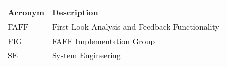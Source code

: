 \addtocounter{table}{-1}
\begin{longtable}{p{}p{}}\hline
\textbf{Acronym} & \textbf{Description}  \\\hline

FAFF & First-Look Analysis and Feedback Functionality \\\hline
FIG & FAFF Implementation Group \\\hline
SE & System Engineering \\\hline
\end{longtable}
